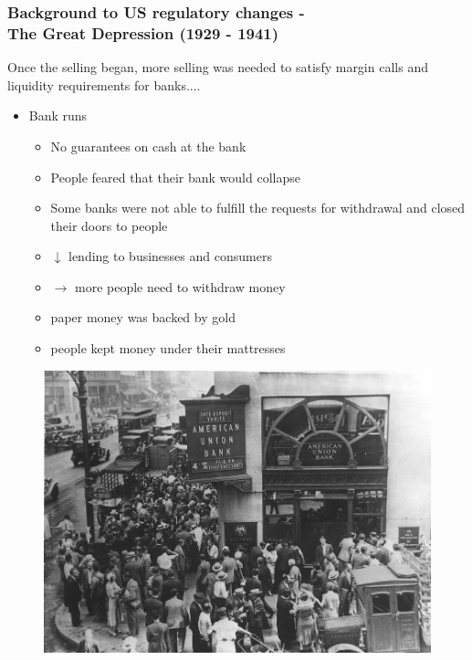 \documentclass[11pt]{beamer}
\begin{document}
\begin{frame}
\frametitle{Background to US regulatory changes - \\ The Great Depression (1929 - 1941)}
Once the selling began, more selling was needed to satisfy margin calls and liquidity requirements for banks....
\\

\begin{itemize}
\item Bank runs
\begin{itemize}
\item No guarantees on cash at the bank
\item People feared that their bank would collapse
\item Some banks were not able to fulfill the requests for withdrawal and closed their doors to people
\item $\downarrow$ lending to businesses and consumers
\item $\rightarrow$ more people need to withdraw money
\item paper money was backed by gold
\item people kept money under their mattresses
\end{itemize}

\end{itemize}

\end{frame}
\begin{frame}
\begin{figure}
\includegraphics[width=1\textwidth]{Bankrun.png}
\end{figure}
\end{frame}
\end{document}
